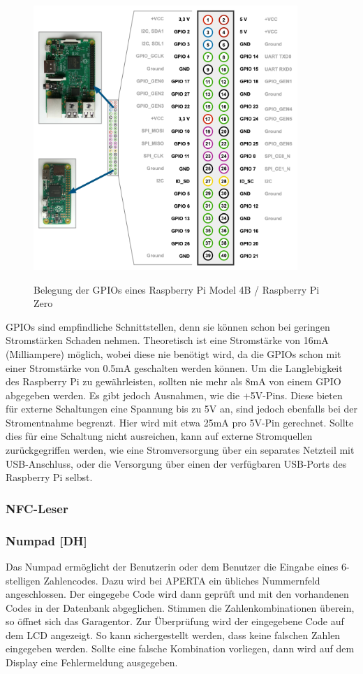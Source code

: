 \begin{figure}
  \centering
  \includegraphics[width=10cm]{pics/GPIO.png}
  \caption{Belegung der GPIOs eines Raspberry Pi Model 4B / Raspberry Pi Zero}
  \cite{GPIOLayout}
\end{figure}
GPIOs sind empfindliche Schnittstellen, denn sie können schon bei geringen Stromstärken Schaden nehmen. Theoretisch ist eine Stromstärke von 16mA (Milliampere) möglich, wobei diese nie benötigt wird, da die GPIOs schon mit einer Stromstärke von 0.5mA geschalten werden können. Um die Langlebigkeit des Raspberry Pi zu gewährleisten, sollten nie mehr als 8mA von einem GPIO abgegeben werden. 
Es gibt jedoch Ausnahmen, wie die +5V-Pins. Diese bieten für externe Schaltungen eine Spannung bis zu 5V an, sind jedoch ebenfalls bei der Stromentnahme begrenzt. Hier wird mit etwa 25mA pro 5V-Pin gerechnet. Sollte dies für eine Schaltung nicht ausreichen, kann auf externe Stromquellen zurückgegriffen werden, wie eine Stromversorgung über ein separates Netzteil mit USB-Anschluss, oder die Versorgung über einen der verfügbaren USB-Ports des Raspberry Pi selbst. 

\cite{GPIO}
\subsubsection{NFC-Leser}
\subsubsection{Numpad [DH]}
Das Numpad ermöglicht der Benutzerin oder dem Benutzer die Eingabe eines 6-stelligen Zahlencodes. Dazu wird bei APERTA ein übliches Nummernfeld angeschlossen. Der eingegebe Code wird dann geprüft und mit den vorhandenen Codes in der Datenbank abgeglichen. Stimmen die Zahlenkombinationen überein, so öffnet sich das Garagentor. Zur Überprüfung wird der eingegebene Code auf dem LCD angezeigt. So kann sichergestellt werden, dass keine falschen Zahlen eingegeben werden. Sollte eine falsche Kombination vorliegen, dann wird auf dem Display eine Fehlermeldung ausgegeben.

